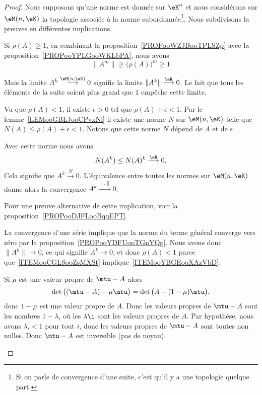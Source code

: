 \begin{proof}
	Nous supposons qu'une norme est donnée sur \( \eK^n\) et nous considérons sur \( \eM(n,\eK)\) la topologie associée à la norme subordonnée\footnote{Si on parle de convergence d'une suite, c'est qu'il y a une topologie quelque part.}. Nous subdivisons la preuves en différentes implications.
	\begin{subproof}
		Si \( \rho(A)\geq 1\), en combinant la proposition~\ref{PROPooWZJBooTPLSZp} avec la proposition~\ref{PROPooYPLGooWKLbPA}, nous avons
		\begin{equation}
			\| A^m \|\geq \big( \rho(A) \big)^m\geq 1
		\end{equation}

		Mais la limite \( A^k\stackrel{\eM(n,\eK)}{\longrightarrow} 0\) signifie la limite \( \| A^k \|\stackrel{\eR}{\longrightarrow}0\). Le fait que tous les éléments de la suite soient plus grand que \( 1\) empêche cette limite.

		Vu que \( \rho(A)<1\), il existe \( \epsilon>0\) tel que \( \rho(A)+\epsilon<1\). Par le lemme~\ref{LEMooGBLJooCPvxNl} il existe une norme \( N\) sur \( \eM(n,\eK)\) telle que \( N(A)\leq \rho(A)+\epsilon<1\). Notons que cette norme \( N\) dépend de \( A\) et de \( \epsilon\).

		Avec cette norme nous avons
		\begin{equation}
			N(A^k)\leq N(A)^k\stackrel{\eR}{\longrightarrow}0.
		\end{equation}
		Cela signifie que \( A^k\stackrel{N}{\longrightarrow}0\). L'équivalence entre toutes les normes sur \( \eM(n,\eK)\) donne alors la convergence \( A^k\stackrel{\| . \|}{\longrightarrow}0\).

		Pour une preuve alternative de cette implication, voir la proposition~\ref{PROPooDJFLooBqqEPT}.


		La convergence d'une série implique que la norme du terme général converge vers zéro par la proposition~\ref{PROPooYDFUooTGnYQg}. Nous avons donc \( \| A^k \|\to 0\), ce qui signifie \( A^k\to 0\), et donc \( \rho(A)<1\) parce que~\ref{ITEMooCGLSooZsMXSt} implique~\ref{ITEMooYBGEooXAzVbD}.


		Si \( \mu\) est une valeur propre de \( \mtu-A\) alors
		\begin{equation}
			\det\big( (\mtu-A)-\mu\mtu \big)=\det\big( A-(1-\mu)\mtu \big),
		\end{equation}
		donc \( 1-\mu\) est une valeur propre de \( A\). Donc les valeurs propres de \( \mtu-A\) sont les nombres \( 1-\lambda_i\) où les \( \lambda\i\) sont les valeurs propres de \( A\). Par hypothèse, nous avons \( \lambda_i<1\) pour tout \( i\), donc les valeurs propres de \( \mtu-A\) sont toutes non nulles. Donc \( \mtu-A\) est inversible (pas de noyau).


\end{subproof}
\end{proof}
